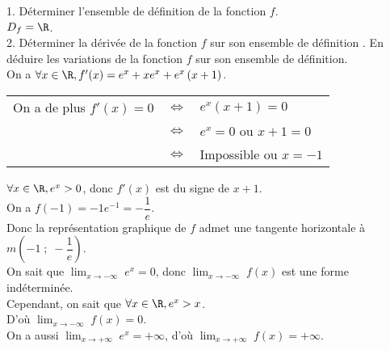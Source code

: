 \vspace*{.3cm}

1. Déterminer l'ensemble de définition de la fonction $f$. \\

$D_f = \R$. \\

2. Déterminer la dérivée de la fonction $f$ sur son ensemble de définition . En déduire les variations de la fonction $f$ sur son ensemble de définition. \\

On a $\forall x \in \R, f'(x) = e^x + xe^x + e^x\left(x+1\right)$. \\

\begin{tabular}{lll}
\hspace*{-.3cm} On a de plus $f'(x) = 0$ & $\Longleftrightarrow$ & $e^x\left(x+1\right) = 0$ \\
& $\Longleftrightarrow$ & $e^x = 0$ ou $x+1 = 0$ \\
& $\Longleftrightarrow$ & Impossible ou $x = -1$ \\
\end{tabular}

\vspace*{.3cm}

$\forall x \in \R, e^x > 0$, donc $f'(x)$ est du signe de $x+1$. \\

On a $f\left(-1\right) = -1e^{-1} = -\dfrac{1}{e}$. \\

Donc la représentation graphique de $f$ admet une tangente horizontale à $m\left(-1 \; ; \; -\dfrac{1}{e}\right)$. \\

On sait que $ \displaystyle {\lim_{x \rightarrow -\infty}} \; e^x = 0$, donc $ \displaystyle {\lim_{x \rightarrow -\infty}} \; f(x)$ est une forme indéterminée. \\

Cependant, on sait que $\forall x \in \R, e^x > x$. \\

D'où $ \displaystyle {\lim_{x \rightarrow -\infty}} \; f(x) = 0$. \\

On a aussi $ \displaystyle {\lim_{x \rightarrow +\infty}} \; e^x = +\infty$, d'où $ \displaystyle {\lim_{x \rightarrow +\infty}} \; f(x) = +\infty$.

\vspace*{.3cm}


